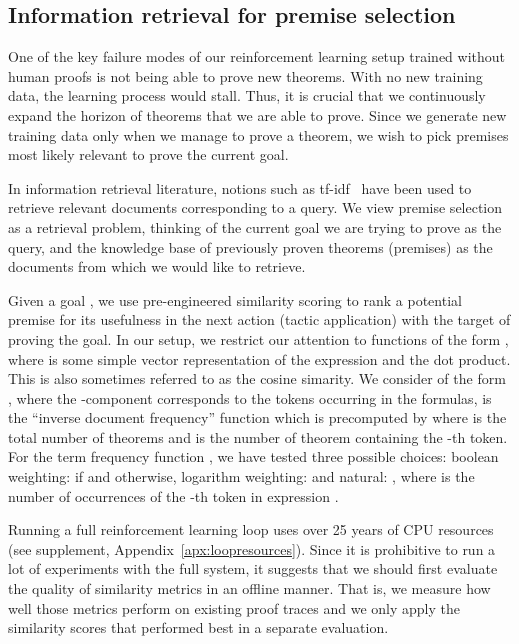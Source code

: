 \documentclass{article}
\begin{document}
\subsection{Information retrieval for premise selection}
\label{sec:retrieval}
One of the key failure modes of our reinforcement learning setup trained without human proofs is not being able to prove new theorems.
With no new training data, the learning process would stall.
Thus, it is crucial that we continuously expand the horizon of theorems that we are able to prove.
Since we generate new training data only when we manage to prove a theorem, we wish to pick premises most likely relevant to prove the current goal.

In information retrieval literature, notions such as
tf-idf~\citep{manning2008introduction} have been used to retrieve relevant documents corresponding to a query.
We view premise selection as a retrieval problem, thinking of the current goal we are trying to prove as the query, and the knowledge base of previously proven theorems (premises) as the documents from which we would like to retrieve.

Given a goal , we use pre-engineered similarity
scoring  to rank a potential premise  for its usefulness
in the next action (tactic application) with the target of proving the goal.
In our setup, we restrict our attention to functions of the form 
,
where 
is some simple vector representation of the expression and  the dot product. This is also sometimes referred to as the cosine simarity.
We consider  of the form , where the -component corresponds to the tokens occurring in the formulas,  is the ``inverse document frequency'' function which is precomputed by  where  is the total number of theorems and  is the number of theorem containing the -th token. For the term frequency function , we have tested three possible choices: boolean weighting:  if  and  otherwise, logarithm weighting:  and natural: , where  is the number of occurrences of the -th token in expression . 

Running a full reinforcement learning loop uses over 25 years of CPU resources (see supplement, Appendix~\ref{apx:loopresources}).
Since it is prohibitive to run a lot of experiments with the full system, it suggests that we should first evaluate the quality of similarity metrics in an offline manner.
That is, we measure how well those metrics perform on existing proof traces and we only apply the similarity scores that performed best in a separate evaluation.
\end{document}
